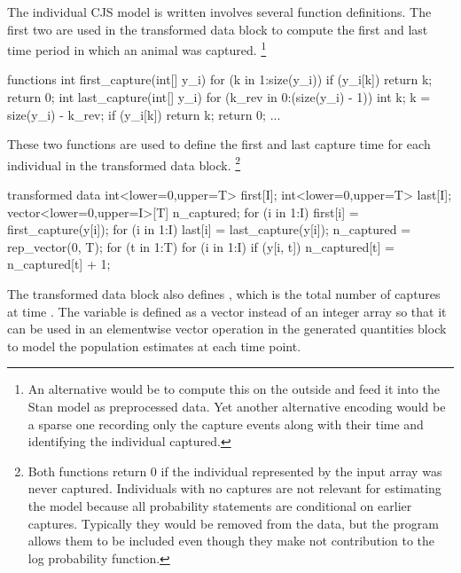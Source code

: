 The individual CJS model is written involves several function
definitions.  The first two are used in the transformed data block to
compute the first and last time period in which an animal was
captured.%
%
\footnote{An alternative would be to compute this on the outside and
feed it into the Stan model as preprocessed data.  Yet another
alternative encoding would be a sparse one recording only the
capture events along with their time and identifying the individual
captured.}
%
\begin{stancode}
functions {
  int first_capture(int[] y_i) {
    for (k in 1:size(y_i))
      if (y_i[k])
        return k;
    return 0;
  }
  int last_capture(int[] y_i) {
    for (k_rev in 0:(size(y_i) - 1)) {
      int k;
      k = size(y_i) - k_rev;
      if (y_i[k])
        return k;
    }
    return 0;
  }
  ...
}
\end{stancode}
%
These two functions are used to define the first and last capture time
for each individual in the transformed data block.%
%
\footnote{Both functions return 0 if the individual represented by the
  input array was never captured.  Individuals with no captures are
  not relevant for estimating the model because all probability
  statements are conditional on earlier captures.  Typically they
  would be removed from the data, but the program allows them to be
  included even though they make not contribution to the log
  probability function.}
%
\begin{stancode}
transformed data {
  int<lower=0,upper=T> first[I];
  int<lower=0,upper=T> last[I];
  vector<lower=0,upper=I>[T] n_captured;
  for (i in 1:I)
    first[i] = first_capture(y[i]);
  for (i in 1:I)
    last[i] = last_capture(y[i]);
  n_captured = rep_vector(0, T);
  for (t in 1:T)
    for (i in 1:I)
      if (y[i, t])
        n_captured[t] = n_captured[t] + 1;
}
\end{stancode}
%
The transformed data block also defines , which is
the total number of captures at time .  The variable
 is defined as a vector instead of an integer array
so that it can be used in an elementwise vector operation in the generated
quantities block to model the population estimates at each time point.

